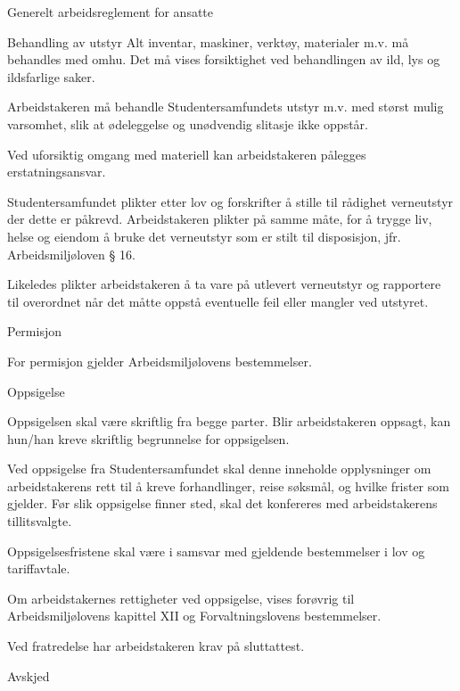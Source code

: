 \begin{lovkapittel}{Generelt arbeidsreglement for ansatte}
  \begin{lovparagraf}{Behandling av utstyr}
Alt inventar, maskiner, verktøy, materialer m.v. må behandles med omhu. Det må vises forsiktighet ved behandlingen
av ild, lys og ildsfarlige saker.

Arbeidstakeren må behandle Studentersamfundets utstyr m.v. med størst mulig varsomhet, slik at ødeleggelse og
unødvendig slitasje ikke oppstår.

Ved uforsiktig omgang med materiell kan arbeidstakeren pålegges erstatningsansvar.

Studentersamfundet plikter etter lov og forskrifter å stille til rådighet verneutstyr der dette er påkrevd. Arbeidstakeren
plikter på samme måte, for å trygge liv, helse og eiendom å bruke det verneutstyr som er stilt til disposisjon, jfr.
Arbeidsmiljøloven § 16.

Likeledes plikter arbeidstakeren å ta vare på utlevert verneutstyr og rapportere til overordnet når det måtte oppstå
eventuelle feil eller mangler ved utstyret.

  \end{lovparagraf}

  \begin{lovparagraf}{Permisjon}

For permisjon gjelder Arbeidsmiljølovens bestemmelser.

  \end{lovparagraf}

  \begin{lovparagraf}{Oppsigelse}

Oppsigelsen skal være skriftlig fra begge parter. Blir arbeidstakeren oppsagt, kan hun/han kreve skriftlig begrunnelse
for oppsigelsen.

Ved oppsigelse fra Studentersamfundet skal denne inneholde opplysninger om arbeidstakerens rett til å kreve
forhandlinger, reise søksmål, og hvilke frister som gjelder. Før slik oppsigelse finner sted, skal det konfereres med
arbeidstakerens tillitsvalgte.

Oppsigelsesfristene skal være i samsvar med gjeldende bestemmelser i lov og tariffavtale.

Om arbeidstakernes rettigheter ved oppsigelse, vises forøvrig til Arbeidsmiljølovens kapittel XII og
Forvaltningslovens bestemmelser.

Ved fratredelse har arbeidstakeren krav på sluttattest.

  \end{lovparagraf}

  \begin{lovparagraf}{Avskjed}


\end{lovparagraf}
\end{lovkapittel}
